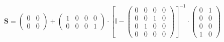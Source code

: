 \[ \mathbf{S} = \left(\begin{array}{cc} 0 & 0 \\ 0 & 0
\end{array}\right) + \left(\begin{array}{cccc} 1 & 0 & 0 & 0 \\ 0 & 0
& 0 & 1 \end{array}\right) \cdot \left[ \mathbb{I}  -
\left(\begin{array}{cccc} 0 & 0 & 0 & 0 \\ 0 & 0 & 1 & 0 \\ 0 & 1 & 0
& 0 \\ 0 & 0 & 0 & 0 \end{array}\right) \right]^{-1}
\cdot\left(\begin{array}{cc} 0 & 1 \\ 0 & 0 \\ 0 & 0 \\ 1 & 0
\end{array}\right) \]
